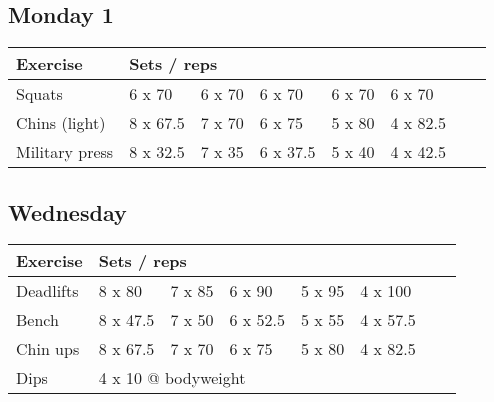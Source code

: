 \documentclass[12pt, a4paper]{article}%
\begin{document}
  \subsection*{\hspace{0.5em} Monday 1 }


  \begin{tabular}{l|lllllll}
  \hspace{0.75em} \textbf{Exercise} & \multicolumn{ 7 }{l}{ \textbf{Sets / reps} } \\ \hline

            \hspace{0.75em} Squats
            & 6 x 70
            & 6 x 70
            & 6 x 70
            & 6 x 70
            & 6 x 70
            & 
            & 
            \\


            \hspace{0.75em} Chins (light)
            & 8 x 67.5
            & 7 x 70
            & 6 x 75
            & 5 x 80
            & 4 x 82.5
            & 
            & 
            \\


            \hspace{0.75em} Military press
            & 8 x 32.5
            & 7 x 35
            & 6 x 37.5
            & 5 x 40
            & 4 x 42.5
            & 
            & 
            \\


  \end{tabular}

  \subsection*{\hspace{0.5em} Wednesday }


  \begin{tabular}{l|lllllll}
  \hspace{0.75em} \textbf{Exercise} & \multicolumn{ 7 }{l}{ \textbf{Sets / reps} } \\ \hline

            \hspace{0.75em} Deadlifts
            & 8 x 80
            & 7 x 85
            & 6 x 90
            & 5 x 95
            & 4 x 100
            & 
            & 
            \\


            \hspace{0.75em} Bench
            & 8 x 47.5
            & 7 x 50
            & 6 x 52.5
            & 5 x 55
            & 4 x 57.5
            & 
            & 
            \\


            \hspace{0.75em} Chin ups
            & 8 x 67.5
            & 7 x 70
            & 6 x 75
            & 5 x 80
            & 4 x 82.5
            & 
            & 
            \\


   \hspace{0.75em} Dips &  \multicolumn{ 7 }{l}{ 4 x 10 @ bodyweight } \\
  \end{tabular}
\end{document}
